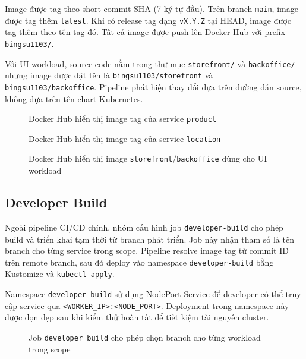 Image được tag theo short commit SHA (7 ký tự đầu). Trên branch \texttt{main}, image được tag thêm \texttt{latest}. Khi có release tag dạng \texttt{vX.Y.Z} tại HEAD, image được tag thêm theo tên tag đó. Tất cả image được push lên Docker Hub với prefix \texttt{bingsu1103/}.

Với UI workload, source code nằm trong thư mục \texttt{storefront/} và \texttt{backoffice/} nhưng image được đặt tên là \texttt{bingsu1103/storefront} và \texttt{bingsu1103/backoffice}. Pipeline phát hiện thay đổi dựa trên đường dẫn source, không dựa trên tên chart Kubernetes.

\begin{figure}[H]
\centering
{}
\caption{Docker Hub hiển thị image tag của service \texttt{product}}
\end{figure}

\begin{figure}[H]
\centering
{}
\caption{Docker Hub hiển thị image tag của service \texttt{location}}
\end{figure}

\begin{figure}[H]
\centering
{}
\caption{Docker Hub hiển thị image \texttt{storefront}/\texttt{backoffice} dùng cho UI workload}
\end{figure}

\subsection{Developer Build}

Ngoài pipeline CI/CD chính, nhóm cấu hình job \texttt{developer-build} cho phép build và triển khai tạm thời từ branch phát triển. Job này nhận tham số là tên branch cho từng service trong scope. Pipeline resolve image tag từ commit ID trên remote branch, sau đó deploy vào namespace \texttt{developer-build} bằng Kustomize và \texttt{kubectl apply}.

Namespace \texttt{developer-build} sử dụng NodePort Service để developer có thể truy cập service qua \texttt{<WORKER\_IP>:<NODE\_PORT>}. Deployment trong namespace này được dọn dẹp sau khi kiểm thử hoàn tất để tiết kiệm tài nguyên cluster.

\begin{figure}[H]
\centering
{}
\caption{Job \texttt{developer\_build} cho phép chọn branch cho từng workload trong scope}
\end{figure}

